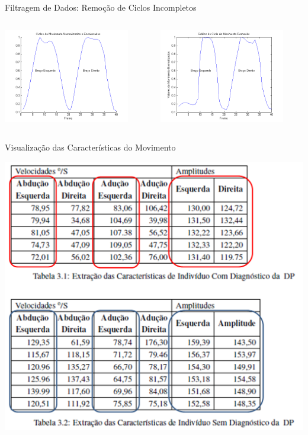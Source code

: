\documentclass{beamer}
\begin{document}
\begin{frame}{Filtragem de Dados: Remoção de Ciclos Incompletos}
   \begin{block}{}
   
   \begin{columns}[c]
     \begin{column}{0.5\linewidth}
				\includegraphics[width=5.5cm]{img/ciclonormalizadoescalonado.png}
     \end{column}

     \begin{column}{0.55\linewidth}
				\includegraphics[width=5.5cm]{img/ciclomovimentoremovido.png}
    \end{column}
\end{columns}
\end{block}
\end{frame}

\begin{frame}{Visualização das Características do Movimento}
  \begin{block}{}
      \center \includegraphics[height=2.2 in]{img/caracteristicas-tabela.png}
  \end{block}
\end{frame}
\end{document}
